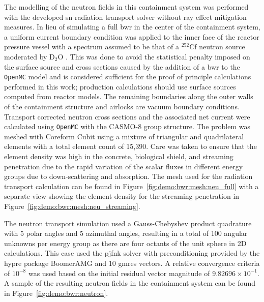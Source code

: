 The modelling of the neutron fields in this containment system was performed with the developed \acrshort{sn} radiation transport solver without ray effect mitigation measures. In lieu of simulating a full \acrshort{bwr} in the center of the containment system, a uniform current boundary condition was applied to the inner face of the reactor pressure vessel with a spectrum assumed to be that of a $\mathrm{^{252}Cf}$ neutron source moderated by $\mathrm{D_{2}O}$ \cite{iso_neutron}. This was done to avoid the statistical penalty imposed on the surface source and cross sections caused by the addition of a \acrshort{bwr} to the \texttt{OpenMC} model and is considered sufficient for the proof of principle calculations performed in this work; production calculations should use surface sources computed from reactor models. The remaining boundaries along the outer walls of the containment structure and airlocks are vacuum boundary conditions. Transport corrected neutron cross sections and the associated net current were calculated using \texttt{OpenMC} \cite{openmc} with the CASMO-8 group structure. The problem was meshed with Coreform Cubit using a mixture of triangular and quadrilateral elements with a total element count of 15,390. Care was taken to ensure that the element density was high in the concrete, biological shield, and streaming penetration due to the rapid variation of the scalar fluxes in different energy groups due to down-scattering and absorption. The mesh used for the radiation transport calculation can be found in Figure~\ref{fig:demo:bwr:mesh:neu_full} with a separate view showing the element density for the streaming penetration in Figure~\ref{fig:demo:bwr:mesh:neu_streaming}.

The neutron transport simulation used a Gauss-Chebyshev product quadrature with 5 polar angles and 5 azimuthal angles, resulting in a total of 100 angular unknowns per energy group as there are four octants of the unit sphere in 2D calculations. This case used the \acrshort{pjfnk} solver with preconditioning provided by the hypre package BoomerAMG and 10 \acrshort{gmres} vectors. A relative convergence criteria of $10^{-8}$ was used based on the initial residual vector magnitude of $9.82696\times 10^{-1}$. A sample of the resulting neutron fields in the containment system can be found in Figure~\ref{fig:demo:bwr:neutron}.

